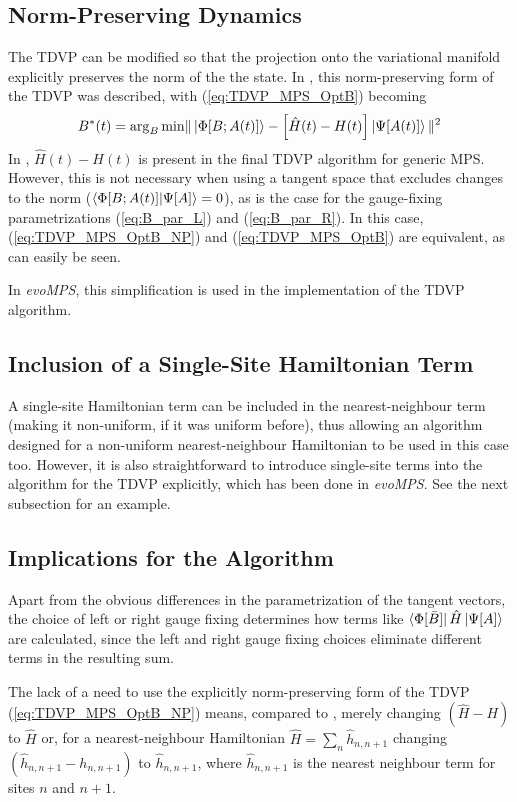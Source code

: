 \documentclass[a4paper,11pt]{article}
\begin{document}
\subsection{Norm-Preserving Dynamics}
The TDVP can be modified so that the projection onto the variational manifold
explicitly preserves the norm of the the state. In \cite{haegeman_time-dependent_2011},
this norm-preserving form of the TDVP was described, with (\ref{eq:TDVP_MPS_OptB}) becoming
\begin{equation}
    B^*(t) = \arg_B \mathrm{min} \| \ket{\Phi[B;A(t)]} - \left[\hat{H}(t) - H(t)\right]\ket{\Psi[A(t)]} \|^2
    \label{eq:TDVP_MPS_OptB_NP}
\end{equation}
In \cite{haegeman_time-dependent_2011}, $\hat{H}(t) - H(t)$ is present in
the final TDVP algorithm for generic MPS. However, this is not necessary when using
a tangent space that excludes changes to the norm ($\braket{\Phi[B;A(t)]|\Psi[A]} = 0$),
as is the case for the gauge-fixing parametrizations (\ref{eq:B_par_L}) and (\ref{eq:B_par_R}).
In this case, (\ref{eq:TDVP_MPS_OptB_NP}) and (\ref{eq:TDVP_MPS_OptB}) are equivalent,
as can easily be seen.

In \emph{evoMPS}, this simplification is used in the implementation of the TDVP algorithm.

\subsection{Inclusion of a Single-Site Hamiltonian Term}
A single-site Hamiltonian term can be included in the nearest-neighbour term (making
it non-uniform, if it was uniform before), 
thus allowing an algorithm designed for a non-uniform nearest-neighbour
Hamiltonian to be used in this case too. However, it is also straightforward to introduce single-site
terms into the algorithm for the TDVP explicitly, which has been done in \emph{evoMPS}.
See the next subsection for an example.

\subsection{Implications for the Algorithm}
Apart from the obvious differences in the parametrization of the tangent 
vectors, the choice of left or right gauge fixing determines how terms like
$\bra{\Phi[\bar{B}]}\hat{H}\ket{\Psi[A]}$ are calculated, since the left and
right gauge fixing choices eliminate different terms in the resulting sum.

The lack of a need to use the explicitly norm-preserving form of the TDVP 
(\ref{eq:TDVP_MPS_OptB_NP}) means, compared to
\cite{haegeman_time-dependent_2011}, merely changing $(\hat{H} - H)$ to $\hat{H}$
or, for a nearest-neighbour Hamiltonian $\hat{H} = \sum_n \hat{h}_{n, n+1}$
changing $(\hat{h}_{n, n + 1} - h_{n, n + 1})$ to $\hat{h}_{n, n + 1}$, where 
$\hat{h}_{n, n + 1}$ is the nearest neighbour term for sites $n$ and $n + 1$.
\end{document}
